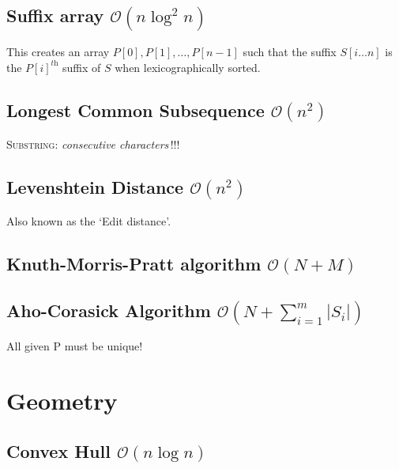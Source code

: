 \documentclass{article}
\begin{document}


\subsection{Suffix array $\mathcal{O}(n \log^2{n})$}

This creates an array $P[0], P[1], \dots, P[n-1]$ such that the suffix $S[i \dots n]$ is the $P[i]^\textit{th}$ suffix of $S$ when lexicographically sorted.



\subsection{Longest Common Subsequence $\mathcal{O}(n^{2})$}
\textsc{Substring}: \textit{consecutive characters}\,!!!



\subsection{Levenshtein Distance $\mathcal{O}(n^{2})$}

Also known as the `Edit distance'.



\subsection{Knuth-Morris-Pratt algorithm $\mathcal{O}(N + M)$}



\subsection{Aho-Corasick Algorithm $\mathcal{O}(N + \sum_{i=1}^{m} |S_i|)$}

All given P must be unique!



\section{Geometry}



\subsection{Convex Hull $\mathcal{O}(n \log n)$}
\end{document}
